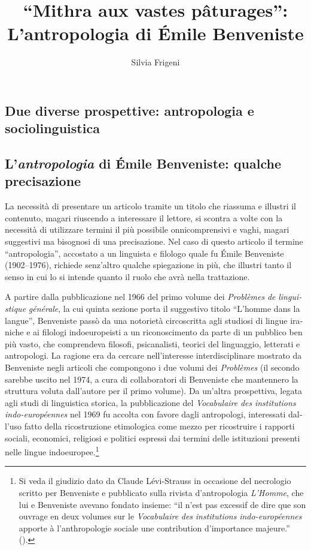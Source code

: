 \documentclass[french,output=paper,colorlinks,citecolor=brown]{../langscibook}
\author{Silvia Frigeni\affiliation{Sapienza Università di Roma, Université Sorbonne Nouvelle -- Paris 3}\orcid{}}
\title{“Mithra aux vastes pâturages”: L’antropologia di Émile Benveniste}
\begin{document}
\begin{otherlanguage}{italian}
\renewcommand{\chapappifchapterprefix}{Chapter}
\maketitle

\section{Due diverse prospettive: antropologia e sociolinguistica} 

\subsection{L’\textit{antropologia} di Émile Benveniste: qualche precisazione}

La necessità di presentare un articolo tramite un titolo che riassuma e illustri il contenuto, magari riuscendo a interessare il lettore, si scontra a volte con la necessità di utilizzare termini il più possibile onnicomprensivi e vaghi, magari suggestivi ma bisognosi di una precisazione. Nel caso di questo articolo il termine “antropologia”, accostato a un linguista e filologo quale fu Émile Benveniste (1902--1976), richiede senz’altro qualche spiegazione in più, che illustri tanto il senso in cui lo si intende quanto il ruolo che avrà nella trattazione. 

A partire dalla pubblicazione nel 1966 del primo volume dei \textit{Problèmes} \textit{de} \textit{linguistique} \textit{générale}, la cui quinta sezione porta il suggestivo titolo “L’homme dans la langue”, Benveniste passò da una notorietà circoscritta agli studiosi di lingue iraniche e ai filologi indoeuropeisti a un riconoscimento da parte di un pubblico ben più vasto, che comprendeva filosofi, psicanalisti, teorici del linguaggio, letterati e antropologi. La ragione era da cercare nell’interesse interdisciplinare mostrato da Benveniste negli articoli che compongono i due volumi dei \textit{Problèmes} (il secondo sarebbe uscito nel 1974, a cura di collaboratori di Benveniste che mantennero la struttura voluta dall’autore per il primo volume). Da un’altra prospettiva, legata agli studi di linguistica storica, la pubblicazione del \textit{Vocabulaire} \textit{des} \textit{institutions} \textit{indo-européennes} nel 1969 fu accolta con favore dagli antropologi, interessati dall’uso fatto della ricostruzione etimologica come mezzo per ricostruire i rapporti sociali, economici, religiosi e politici espressi dai termini delle istituzioni presenti nelle lingue indoeuropee.\footnote{ \textrm{Si veda il giudizio dato da Claude Lévi-Strauss in occasione del necrologio scritto per Benveniste e pubblicato sulla rivista d'antropologia} \textrm{\textit{L’Homme}}\textrm{, che lui e Benveniste avevano fondato insieme:} \textrm{“}\textrm{il n’est pas excessif de dire que son ouvrage en deux volumes sur le} \textrm{\textit{Vocabulaire} \textit{des} \textit{institutions} \textit{indo-européennes}} \textrm{apporte à l’anthropologie sociale une contribution d’importance majeure.}\textrm{”} \textrm{(\citealt[5]{Lévi-Strauss1976}).}}


\end{otherlanguage}
\end{document}

